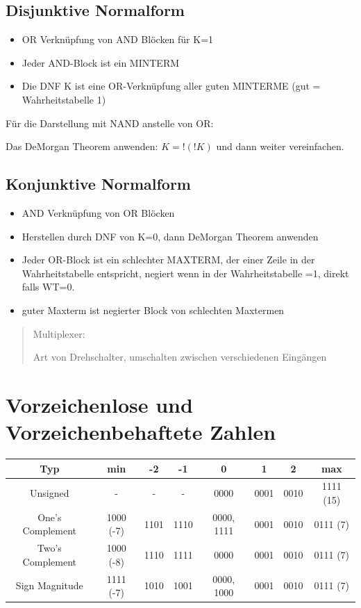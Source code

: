 \subsection*{Disjunktive Normalform}
\begin{itemize}
\item OR Verknüpfung von AND Blöcken für K=1
\item Jeder AND-Block ist ein MINTERM
\item Die DNF K ist eine OR-Verknüpfung aller guten MINTERME (gut = Wahrheitstabelle
1)
\end{itemize}
Für die Darstellung mit NAND anstelle von OR:

Das DeMorgan Theorem anwenden: $K=!(!K)$ und dann weiter vereinfachen.


\subsection*{Konjunktive Normalform}
\begin{itemize}
\item AND Verknüpfung von OR Blöcken
\item Herstellen durch DNF von K=0, dann DeMorgan Theorem anwenden
\item Jeder OR-Block ist ein schlechter MAXTERM, der einer Zeile in der
Wahrheitstabelle entspricht, negiert wenn in der Wahrheitstabelle
=1, direkt falls WT=0.
\item guter Maxterm ist negierter Block von schlechten Maxtermen\end{itemize}
\begin{verse}
Multiplexer:

Art von Drehschalter, umschalten zwischen verschiedenen Eingängen
\end{verse}

\section*{Vorzeichenlose und Vorzeichenbehaftete Zahlen}

\begin{tabular}{|c|c|c|c|c|c|c|c|}
\hline 
Typ & min & -2 & -1 & 0 & 1 & 2 & max\tabularnewline
\hline 
\hline 
Unsigned & - & - & - & 0000 & 0001 & 0010 & 1111 (15)\tabularnewline
\hline 
One's Complement & 1000 (-7) & 1101 & 1110 & 0000, 1111 & 0001 & 0010 & 0111 (7)\tabularnewline
\hline 
Two's Complement & 1000 (-8) & 1110 & 1111 & 0000 & 0001 & 0010 & 0111 (7)\tabularnewline
\hline 
Sign Magnitude & 1111 (-7) & 1010 & 1001 & 0000, 1000 & 0001 & 0010 & 0111 (7)\tabularnewline
\hline 
\end{tabular}

